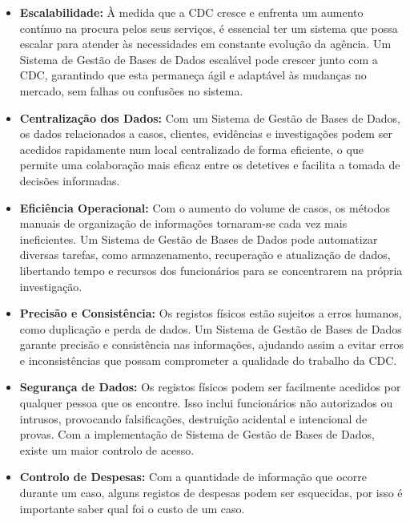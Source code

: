 \documentclass[a4paper,12pt]{scrreprt}
\begin{document}
    \begin{itemize}
        \item \textbf{Escalabilidade:} À medida que a CDC cresce e enfrenta um aumento contínuo na procura pelos
            seus serviços, é essencial ter um sistema que possa escalar para atender às necessidades em constante
            evolução da agência. Um Sistema de Gestão de Bases de Dados escalável pode crescer junto com a CDC, garantindo que
            esta permaneça ágil e adaptável às mudanças no mercado, sem falhas ou confusões no sistema.
            
        \item \textbf{Centralização dos Dados:} Com um Sistema de Gestão de Bases de Dados, os dados relacionados a
            casos, clientes, evidências e investigações podem ser acedidos rapidamente num local centralizado de
            forma eficiente, o que permite uma colaboração mais eficaz entre os detetives e facilita a
            tomada de decisões informadas.
            
        \item\textbf{Eficiência Operacional:} Com o aumento do volume de casos, os métodos manuais de organização de informações tornaram-se cada vez mais ineficientes. Um Sistema de Gestão de Bases de Dados pode automatizar diversas tarefas, como armazenamento, recuperação e atualização de dados, libertando tempo e recursos dos funcionários para se concentrarem na própria investigação.
            
            
        \item \textbf{Precisão e Consistência:} Os registos físicos estão sujeitos a erros humanos, como duplicação e perda de dados. Um Sistema de Gestão de Bases de Dados garante precisão e consistência nas informações, ajudando assim a evitar erros e inconsistências que possam comprometer a qualidade do trabalho da CDC.

        \item \textbf{Segurança de Dados:} Os registos físicos podem ser facilmente acedidos por qualquer pessoa
            que os encontre. Isso inclui funcionários não autorizados ou intrusos, provocando falsificações, destruição
            acidental e intencional de provas. Com a implementação de Sistema de Gestão de Bases de Dados, existe um maior
            controlo de acesso.
            
        \item \textbf{Controlo de Despesas:} Com a quantidade de informação que ocorre durante um caso, alguns registos de despesas podem ser esquecidas, por isso é importante saber qual foi o custo de um caso.
    \end{itemize}
\end{document}
